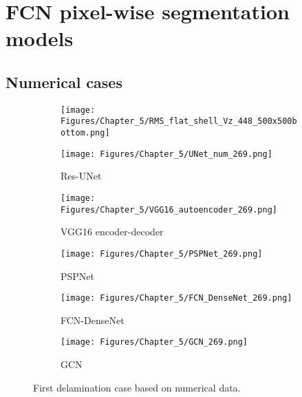 \section{FCN pixel-wise segmentation models}
\label{sec52}


\subsection{Numerical cases}
\label{sec521}

\begin{figure} [!h]
	\centering
	\begin{subfigure}[b]{.48\textwidth}
		\centering
		\texttt{[image: Figures/Chapter\_5/RMS\_flat\_shell\_Vz\_448\_500x500bottom.png]}
		\caption{}
		\label{fig:RMS_bottom_448}
	\end{subfigure}
	\hfill
	\begin{subfigure}[b]{.48\textwidth}
		\centering
		\texttt{[image: Figures/Chapter\_5/UNet\_num\_269.png]}
		\caption{Res-UNet}
		\label{fig:unet_269}	
	\end{subfigure}
	\hfill
	\begin{subfigure}[b]{.48\textwidth}
		\centering
		\texttt{[image: Figures/Chapter\_5/VGG16\_autoencoder\_269.png]}
		\caption{VGG16 encoder-decoder}
		\label{fig:vgg16_269}
	\end{subfigure}
	\hfill
	\begin{subfigure}[b]{.48\textwidth}
		\centering
		\texttt{[image: Figures/Chapter\_5/PSPNet\_269.png]}
		\caption{PSPNet}
		\label{fig:pspnet_269}	
	\end{subfigure}
	\hfill
	\begin{subfigure}[b]{.48\textwidth}
		\centering
		\texttt{[image: Figures/Chapter\_5/FCN\_DenseNet\_269.png]}
		\caption{FCN-DenseNet}
		\label{fig:densenet_269}
	\end{subfigure}
	\hfill
	\begin{subfigure}[b]{.48\textwidth}
		\centering
		\texttt{[image: Figures/Chapter\_5/GCN\_269.png]}
		\caption{GCN}
		\label{fig:gcn_269}	
	\end{subfigure}
	\caption{First delamination case based on numerical data.}
	\label{fig:rms_first_case}
\end{figure}

